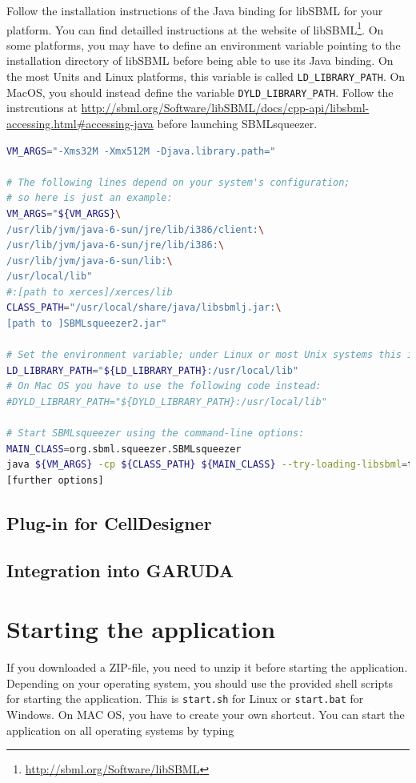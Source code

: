 Follow the installation instructions of the Java binding for libSBML for your
platform.
You can find detailled instructions at the website of
libSBML\footnote{\url{http://sbml.org/Software/libSBML}}.
On some platforms, you may have to define an environment variable pointing
to the installation directory of libSBML before being able to use its Java
binding.
On the most Units and Linux platforms, this variable is called
\texttt{LD\_LIBRARY\_PATH}.
On MacOS, you should instead define the variable \texttt{DYLD\_LIBRARY\_PATH}.
Follow the instrcutions at \url{http://sbml.org/Software/libSBML/docs/cpp-api/libsbml-accessing.html#accessing-java}
before launching SBMLsqueezer.
\begin{lstlisting}[language=bash]
VM_ARGS="-Xms32M -Xmx512M -Djava.library.path="

# The following lines depend on your system's configuration; 
# so here is just an example:
VM_ARGS="${VM_ARGS}\
/usr/lib/jvm/java-6-sun/jre/lib/i386/client:\
/usr/lib/jvm/java-6-sun/jre/lib/i386:\
/usr/lib/jvm/java-6-sun/lib:\
/usr/local/lib"
#:[path to xerces]/xerces/lib
CLASS_PATH="/usr/local/share/java/libsbmlj.jar:\
[path to ]SBMLsqueezer2.jar"

# Set the environment variable; under Linux or most Unix systems this is
LD_LIBRARY_PATH="${LD_LIBRARY_PATH}:/usr/local/lib"
# On Mac OS you have to use the following code instead:
#DYLD_LIBRARY_PATH="${DYLD_LIBRARY_PATH}:/usr/local/lib"

# Start SBMLsqueezer using the command-line options:
MAIN_CLASS=org.sbml.squeezer.SBMLsqueezer 
java ${VM_ARGS} -cp ${CLASS_PATH} ${MAIN_CLASS} --try-loading-libsbml=true\
[further options]
\end{lstlisting}

\subsection{Plug-in for CellDesigner}


\subsection{Integration into GARUDA}

\section{Starting the application}
\label{startingTheProgram}

If you downloaded a ZIP-file, you need to unzip it before starting the
application. Depending on your operating system, you should use the provided
shell scripts for starting the application. This is \texttt{start.sh} for Linux
or \texttt{start.bat} for Windows. On MAC OS, you have to create your own
shortcut. You can start the application on all operating systems by typing

